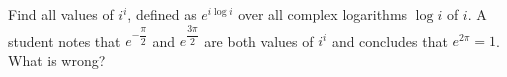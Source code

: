 Find all values of $i^i$, defined as $e^{i\log i}$ over all complex logarithms $\log i$ of $i$. A student notes that $e^{-\dfrac\pi2}$ and $e^{\dfrac{3\pi}{2}}$ are both values of $i^i$ and concludes that $e^{2\pi}=1$. What is wrong?
